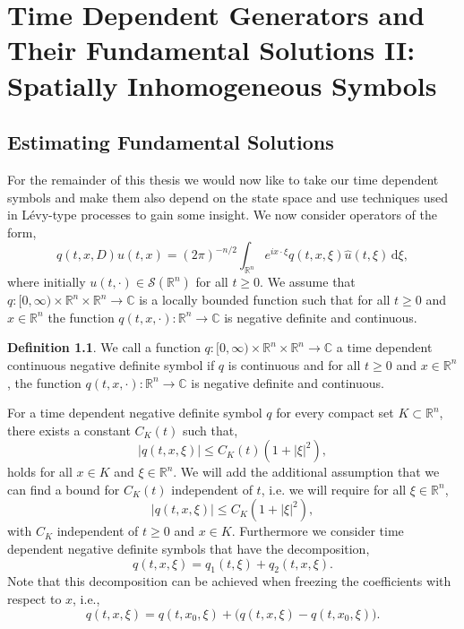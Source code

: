 \documentclass[a4paper, 12pt]{report}
\theoremstyle{cor}
\theoremstyle{remark}
\theoremstyle{definition}
\newtheorem{defn}[theorem]{Definition}
\begin{document}
\chapter{Time Dependent Generators and Their Fundamental Solutions II: Spatially Inhomogeneous Symbols}

\section{Estimating Fundamental Solutions}

For the remainder of this thesis we would now like to take our time dependent symbols and make them also depend on the state space and use techniques used in L\'evy-type processes to gain some insight.  We now consider operators of the form,
\begin{equation}
q(t, x, D)u(t, x) = (2\pi)^{-n/2}\int_{\mathbb{R}^n}e^{ix\cdot\xi}q(t, x, \xi)\hat{u}(t, \xi)\,\mathrm{d}\xi,
\end{equation}
where initially $u(t, \cdot) \in \mathcal{S}(\mathbb{R}^n)$ for all $t \ge 0$.  We assume that $q : [0, \infty) \times \mathbb{R}^n \times \mathbb{R}^n \to \mathbb{C}$ is a locally bounded function such that for all $t \ge 0$ and $x \in \mathbb{R}^n$ the function $q(t, x, \cdot) : \mathbb{R}^n \to \mathbb{C}$ is negative definite and continuous.

\begin{defn}
We call a function $q : [0, \infty) \times \mathbb{R}^n \times \mathbb{R}^n \to \mathbb{C}$ a time dependent continuous negative definite symbol if $q$ is continuous and for all $t \ge 0$ and $x \in \mathbb{R}^n$, the function $q(t, x, \cdot) : \mathbb{R}^n \to \mathbb{C}$ is negative definite and continuous.
\end{defn}

For a time dependent negative definite symbol $q$ for every compact set $K \subset \mathbb{R}^n$, there exists a constant $C_K(t)$ such that,
$$
|q(t, x, \xi)| \le C_K(t)(1 + |\xi|^2),
$$
holds for all $x \in K$ and $\xi \in \mathbb{R}^n$.  We will add the additional assumption that we can find a bound for $C_K(t)$ independent of $t$, i.e. we will require for all $\xi \in \mathbb{R}^n$,
$$
|q(t, x, \xi)| \le C_K(1 + |\xi|^2),
$$
with $C_K$ independent of $t \ge 0$ and $x \in K$.  Furthermore we consider time dependent negative definite symbols that have the decomposition,
\begin{equation}
q(t, x, \xi) = q_1(t, \xi) + q_2(t, x, \xi).
\end{equation}
Note that this decomposition can be achieved when freezing the coefficients with respect to $x$, i.e.,
$$
q(t, x, \xi) = q(t, x_0, \xi) + \big(q(t, x, \xi) - q(t, x_0, \xi)\big).
$$
\end{document}
